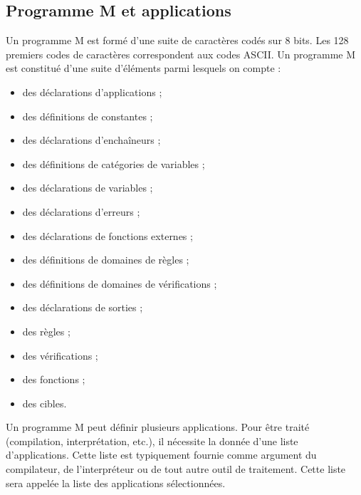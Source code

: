 \documentclass[letterpaper,10pt,french]{sphinxmanual}
\begin{document}
\subsection{Programme M et applications}
\label{\detokenize{syntax:programme-m-et-applications}}
\sphinxAtStartPar
Un programme M est formé d’une suite de caractères codés sur 8 bits.
Les 128 premiers codes de caractères correspondent aux codes ASCII.
Un programme M est constitué d’une suite d’éléments parmi lesquels on compte :
\begin{itemize}
\item {} 
\sphinxAtStartPar
des déclarations d’applications ;

\item {} 
\sphinxAtStartPar
des définitions de constantes ;

\item {} 
\sphinxAtStartPar
des déclarations d’enchaîneurs ;

\item {} 
\sphinxAtStartPar
des définitions de catégories de variables ;

\item {} 
\sphinxAtStartPar
des déclarations de variables ;

\item {} 
\sphinxAtStartPar
des déclarations d’erreurs ;

\item {} 
\sphinxAtStartPar
des déclarations de fonctions externes ;

\item {} 
\sphinxAtStartPar
des définitions de domaines de règles ;

\item {} 
\sphinxAtStartPar
des définitions de domaines de vérifications ;

\item {} 
\sphinxAtStartPar
des déclarations de sorties ;

\item {} 
\sphinxAtStartPar
des règles ;

\item {} 
\sphinxAtStartPar
des vérifications ;

\item {} 
\sphinxAtStartPar
des fonctions ;

\item {} 
\sphinxAtStartPar
des cibles.

\end{itemize}

\sphinxAtStartPar
Un programme M peut définir plusieurs applications.
Pour être traité (compilation, interprétation, etc.), il nécessite la donnée
d’une liste d’applications.
Cette liste est typiquement fournie comme argument du compilateur, de
l’interpréteur ou de tout autre outil de traitement.
Cette liste sera appelée la liste des applications sélectionnées.
\end{document}
